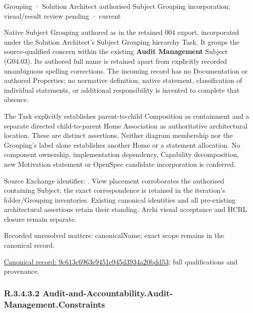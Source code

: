 \label{element:9c613c6963e9451e945d3934a20bdd53}
{\small Grouping · Solution Architect authorised Subject Grouping incorporation; visual/result review pending · current}\par

Native Subject Grouping authored as \texttt{} in the retained 004 export,
incorporated under the Solution Architect's Subject Grouping hierarchy Task.
It groups the source-qualified \texttt{} concern within
the existing \textbf{Audit Management} Subject (G04.03). Its authored full name
is retained apart from explicitly recorded unambiguous spelling corrections.
The incoming record has no Documentation or authored Properties; no normative
definition, native statement, classification of individual statements, or
additional responsibility is invented to complete that absence.



The Task explicitly establishes parent-to-child Composition as containment and
a separate directed child-to-parent Home Association as authoritative architectural
location. These are distinct assertions. Neither diagram membership nor the
Grouping's label alone establishes another Home or a statement allocation.
No component ownership, implementation dependency, Capability decomposition,
new Motivation statement or OpenSpec candidate incorporation is conferred.



Source Exchange identifier: \texttt{}. View placement corroborates
the authorised containing Subject; the exact correspondence is retained in the
iteration's folder/Grouping inventories. Existing canonical identities and all
pre-existing architectural assertions retain their standing. Archi visual
acceptance and HCRL closure remain separate.


{\small Recorded unresolved matters: canonicalName; exact scope remains in the canonical record.}\par
{\footnotesize \href{../../../../continuum/grouping/9c613c6963e9451e945d3934a20bdd53.md}{Canonical record: 9c613c6963e9451e945d3934a20bdd53}; full qualifications and provenance.}\par
\subsubsection*{R.3.4.3.2 Audit-and-Accountability.Audit-Management.Constraints}
\label{navigation:R.3.4.3.2}

